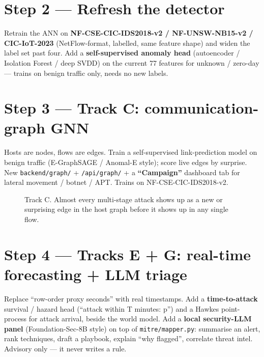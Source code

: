 \documentclass[11pt,a4paper]{article}
\begin{document}
\section{Step 2 --- Refresh the detector}
Retrain the ANN on \textbf{NF-CSE-CIC-IDS2018-v2 / NF-UNSW-NB15-v2 /
CIC-IoT-2023} (NetFlow-format, labelled, same feature shape) and widen the label
set past four. Add a \textbf{self-supervised anomaly head} (autoencoder /
Isolation Forest / deep SVDD) on the current 77 features for unknown / zero-day
--- trains on benign traffic only, needs no new labels.

\section{Step 3 --- Track C: communication-graph GNN}
Hosts are nodes, flows are edges. Train a self-supervised link-prediction model
on benign traffic (E-GraphSAGE / Anomal-E style); score live edges by surprise.
New \texttt{backend/graph/} + \texttt{/api/graph/} + a \textbf{``Campaign''}
dashboard tab for lateral movement / botnet / APT. Trains on
NF-CSE-CIC-IDS2018-v2.

\begin{figure}[H]\centering
{}
\caption{Track C. Almost every multi-stage attack shows up as a new or
surprising edge in the host graph before it shows up in any single flow.}
\end{figure}

\section{Step 4 --- Tracks E + G: real-time forecasting + LLM triage}
Replace ``row-order proxy seconds'' with real timestamps. Add a
\textbf{time-to-attack} survival / hazard head (``attack within T minutes:
p'') and a Hawkes point-process for attack arrival, beside the world model. Add
a \textbf{local security-LLM panel} (Foundation-Sec-8B style) on top of
\texttt{mitre/mapper.py}: summarise an alert, rank techniques, draft a playbook,
explain ``why flagged'', correlate threat intel. Advisory only --- it never
writes a rule.
\end{document}
